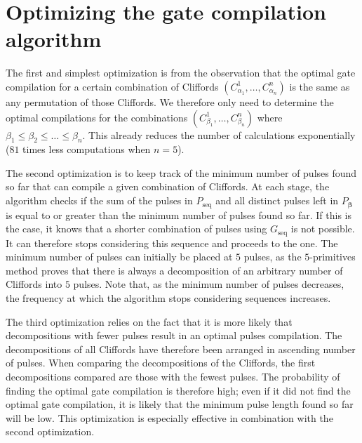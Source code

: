   \section{Optimizing the gate compilation algorithm}
    \label{Optimizing the gate compilation algorithm}

    The first and simplest optimization is from the observation that the optimal gate compilation for a certain combination of Cliffords $\left(C_{\alpha_1}^1, \dots, C_{\alpha_n}^n\right)$ is the same as any permutation of those Cliffords. We therefore only need to determine the optimal compilations for the combinations $\left(C_{\beta_1}^1, \dots, C_{\beta_n}^n\right)$ where $\beta_1 \leq \beta_2 \leq \dots \leq \beta_n$. This already reduces the number of calculations exponentially ($81$ times less computations when $n=5$).

    The second optimization is to keep track of the minimum number of pulses found so far that can compile a given combination of Cliffords. At each stage, the algorithm checks if the sum of the pulses in $P_\text{seq}$ and all distinct pulses left in $P_{\bm{\beta}}$ is equal to or greater than the minimum number of pulses found so far. If this is the case, it knows that a shorter combination of pulses using $G_\text{seq}$ is not possible. It can therefore stops considering this sequence and proceeds to the one. The minimum number of pulses can initially be placed at $5$ pulses, as the $5$-primitives method proves that there is always a decomposition of an arbitrary number of Cliffords into $5$ pulses. Note that, as the minimum number of pulses decreases, the frequency at which the algorithm stops considering sequences increases.

    The third optimization relies on the fact that it is more likely that decompositions with fewer pulses result in an optimal pulses compilation. The decompositions of all Cliffords have therefore been arranged in ascending number of pulses. When comparing the decompositions of the Cliffords, the first decompositions compared are those with the fewest pulses. The probability of finding the optimal gate compilation is therefore high; even if it did not find the optimal gate compilation, it is likely that the minimum pulse length found so far will be low. This optimization is especially effective in combination with the second optimization.

